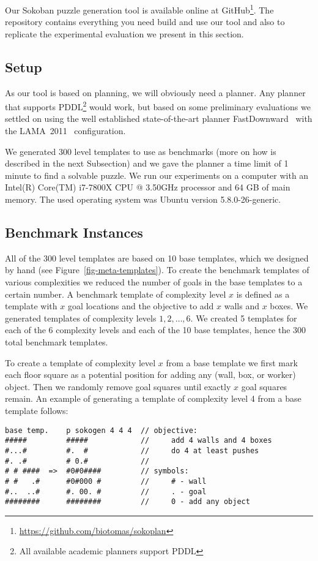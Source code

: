 \documentclass[runningheads]{llncs}
\begin{document}
Our Sokoban puzzle generation tool is available online at GitHub\footnote{\url{https://github.com/biotomas/sokoplan}}.
The repository contains everything you need build and use our tool and also to replicate
the experimental evaluation we present in this section.

\subsection{Setup}
As our tool is based on planning, we will obviously need a planner. Any planner that supports PDDL\footnote{All available academic planners support PDDL} would work, but based on some preliminary evaluations we
settled on using the well established state-of-the-art planner FastDownward~\cite{helmert2006fast} with
the LAMA~2011~\cite{richter2011lama} configuration.

We generated 300 level templates to use as benchmarks (more on how is described in the next Subsection)
and we gave the planner a time limit of 1 minute to find a solvable puzzle. We run our experiments
on a computer with an Intel(R) Core(TM) i7-7800X CPU @ 3.50GHz processor and 64 GB of main memory.
The used operating system was Ubuntu version 5.8.0-26-generic.

\subsection{Benchmark Instances}
All of the 300 level templates are based on 10 base templates, which we designed by hand (see
Figure~\ref{fig-meta-templates}). To create the benchmark templates of various complexities
we reduced the number of goals in the base templates to a certain number. 
A benchmark template of complexity level $x$ is defined as a template with $x$ goal locations and
the objective to add $x$ walls and $x$ boxes.
We generated templates of complexity levels $1,2,\ldots,6$. We created 5 templates for each of 
the 6 complexity levels and each of the 10 base templates, hence the 300 total benchmark templates.

To create a template of complexity level $x$ from a base template we first mark each floor square
as a potential position for adding any (wall, box, or worker) object. Then we randomly remove
goal squares until exactly $x$ goal squares remain. An example of generating a template of complexity
level 4 from a base template follows:
\begin{verbatim}
base temp.    p sokogen 4 4 4  // objective:
#####         #####            //     add 4 walls and 4 boxes
#...#         #.  #            //     do 4 at least pushes 
#. .#         # 0.#            // 
# # ####  =>  #0#0####         // symbols: 
# #   .#      #0#000 #         //     # - wall     
#..  ..#      #. 00. #         //     . - goal     
########      ########         //     0 - add any object
\end{verbatim}
\end{document}
